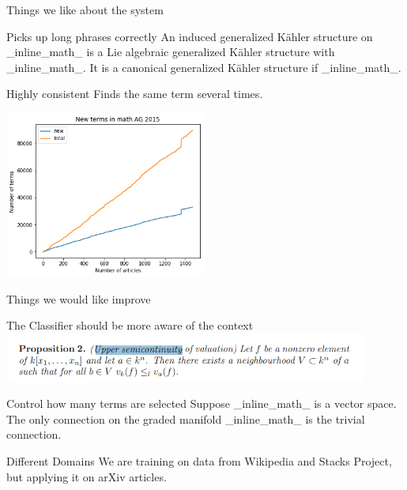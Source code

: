 \documentclass[10pt]{beamer}
\begin{document}
\begin{frame}{Things we like about the system} 
    \begin{block}{Picks up long phrases correctly}
        {\small An {\color{blue}induced generalized Kähler structure} on \_inline\_math\_ is a Lie algebraic generalized Kähler structure with \_inline\_math\_. It is a canonical generalized Kähler structure if \_inline\_math\_.}
    \end{block}
    \begin{block}{Highly consistent}
        Finds the same term several times.
    \end{block}
        \begin{center}
    \includegraphics[width=0.5\textwidth]{cum_terms.png} 
        \end{center}
\end{frame}

\begin{frame}{Things we would like improve} 
    \begin{exampleblock}{The Classifier should be more aware of the context}
        \includegraphics[width=0.9\textwidth]{false_positive_example.png}
    \end{exampleblock}

    \begin{exampleblock}{Control how many terms are selected}
        {\small Suppose \_inline\_math\_ is a {\color{darkgreen}vector space}. The only connection on the {\color{darkgreen}graded manifold} \_inline\_math\_ is the {\color{blue}trivial connection}.}
    \end{exampleblock}
    \begin{exampleblock}{Different Domains}
        We are training on data from Wikipedia and Stacks Project, but applying it on arXiv articles.
    \end{exampleblock}
\end{frame}
\end{document}
